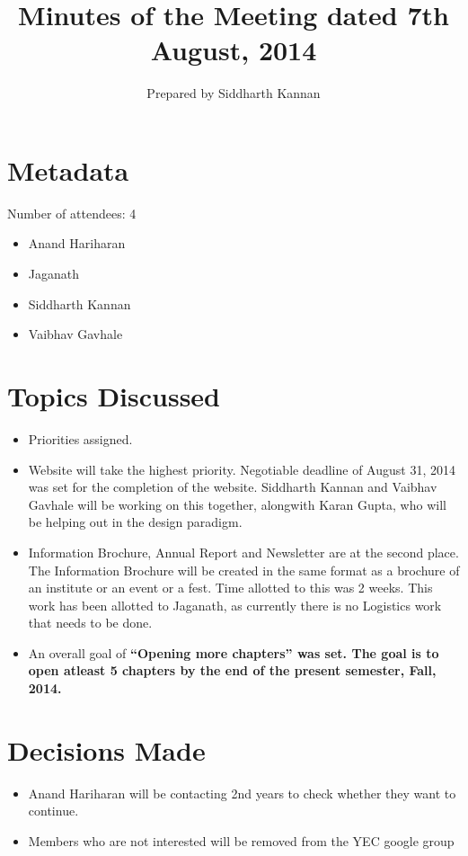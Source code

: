 \documentclass[a4paper, 10pt]{article}
\title{Minutes of the Meeting dated 7th August, 2014}
\author{Prepared by Siddharth Kannan}
\begin{document}
\maketitle

\section{Metadata}

Number of attendees: 4

\begin{itemize}
\item{Anand Hariharan}
\item{Jaganath}
\item{Siddharth Kannan}
\item{Vaibhav Gavhale}
\end{itemize}

\section{Topics Discussed}

\begin{itemize}

\item{Priorities assigned.}

\item{Website will take the highest priority. Negotiable deadline of August 31, 2014 was set for the completion of the website. Siddharth Kannan and
Vaibhav Gavhale will be working on this together, alongwith Karan Gupta, who will be helping out in the design paradigm.}

\item{Information Brochure, Annual Report and Newsletter are at the second place. The Information Brochure will be created in the same format
as a brochure of an institute or an event or a fest. Time allotted to this was 2 weeks. This work has been allotted to Jaganath, as currently
there is no Logistics work that needs to be done.}

\item{An overall goal of \bf ``Opening more chapters'' \rm was set. The goal is to open atleast 5 chapters by the end of the present semester, Fall, 2014.}

\end{itemize}

\section{Decisions Made}

\begin{itemize}
\item{Anand Hariharan will be contacting 2nd years to check whether they want to continue.}
\item{Members who are not interested will be removed from the YEC google group}
\end{itemize}
\end{document}
